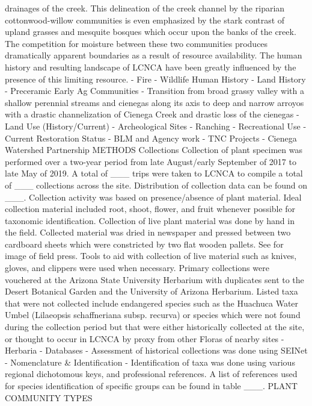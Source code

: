 \documentclass{article}
\begin{document}
drainages of the creek. This delineation of the creek channel by the riparian cottonwood-willow communities is even emphasized by the stark contrast of upland grasses and mesquite bosques which occur upon the banks of the creek. The competition for moisture between these two communities produces dramatically apparent boundaries as a result of resource availability. The human history and resulting landscape of LCNCA have been greatly influenced by the presence of this limiting resource.
-	Fire
-	Wildlife
Human History
-	Land History
-	Preceramic Early Ag Communities
-	Transition from broad grassy valley with a shallow perennial streams and cienegas along its axis to deep and narrow arroyos with a drastic channelization of Cienega Creek and drastic loss of the cienegas
-	Land Use (History/Current)
-	Archeological Sites
-	Ranching
-	Recreational Use
-	Current Restoration Status
-	BLM and Agency work
-	TNC Projects
-	Cienega Watershed Partnership
METHODS
Collections
Collection of plant specimen was performed over a two-year period from late August/early September of 2017 to late May of 2019. A total of ___ trips were taken to LCNCA to compile a total of ___ collections across the site. Distribution of collection data can be found on ___. Collection activity was based on presence/absence of plant material. Ideal collection material included root, shoot, flower, and fruit whenever possible for taxonomic identification. Collection of live plant material was done by hand in the field. Collected material was dried in newspaper and pressed between two cardboard sheets which were constricted by two flat wooden pallets. See for image of field press. Tools to aid with collection of live material such as knives, gloves, and clippers were used when necessary. Primary collections were vouchered at the Arizona State University Herbarium with duplicates sent to the Desert Botanical Garden and the University of Arizona Herbarium. Listed taxa that were not collected include endangered species such as the Huachuca Water Umbel (Lilaeopsis schaffneriana subsp. recurva) or species which were not found during the collection period but that were either historically collected at the site, or thought to occur in LCNCA by proxy from other Floras of nearby sites
-	Herbaria
-	Databases
-	Assessment of historical collections was done using SEINet
-	Nomenclature & Identification
-	Identification of taxa was done using various regional dichotomous keys, and professional references. A list of references used for species identification of specific groups can be found in table ___.
PLANT COMMUNITY TYPES
\end{document}
